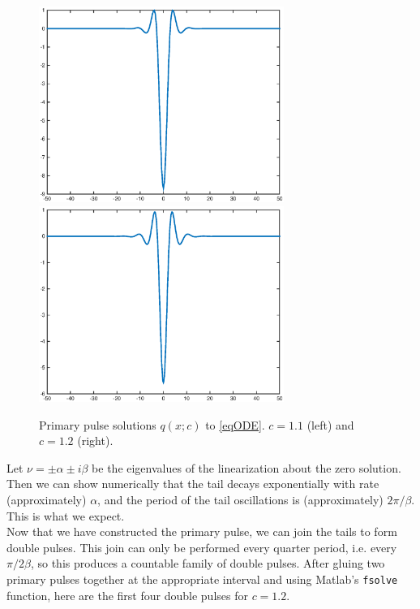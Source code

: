 \documentclass[12pt]{article}
\begin{document}
\begin{figure}[H]
\centering
\includegraphics[width=8cm]{single11.eps}
\includegraphics[width=8cm]{single12.eps}
\label{fig:single2}
\caption{Primary pulse solutions $q(x;c)$ to \eqref{eqODE}. $c = 1.1$ (left) and $c = 1.2$ (right).}
\end{figure}

Let $\nu = \pm \alpha \pm i \beta$ be the eigenvalues of the linearization about the zero solution. Then we can show numerically that the tail decays exponentially with rate (approximately) $\alpha$, and the period of the tail oscillations is (approximately) $2 \pi / \beta$. This is what we expect. \\

Now that we have constructed the primary pulse, we can join the tails to form double pulses. This join can only be performed every quarter period, i.e. every $\pi / 2 \beta$, so this produces a countable family of double pulses. After gluing two primary pulses together at the appropriate interval and using Matlab's \texttt{fsolve} function, here are the first four double pulses for $c = 1.2$.
\end{document}
